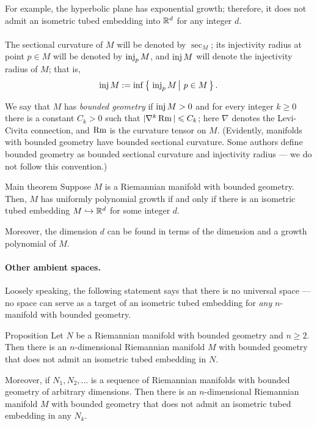 \arxiv{\documentclass[a4paper,10pt]{article}}{\documentclass{mjm}}
\begin{document}
For example,
the hyperbolic plane has exponential growth;
therefore, it does not admit an isometric tubed embedding into $\mathbb{R}^d$ for any integer $d$.




\paragraph{}\label{par:main} 
The sectional curvature of $M$ will be denoted by $\sec_M$;
its injectivity radius at point $p\in M$ will be denoted by $\operatorname{\rm inj}_pM$, and $\operatorname{\rm inj} M$ will denote the injectivity radius of $M$; that is, 
\[\inj M\df \inf\set{\inj_pM}{p\in M}.\]

We say that $M$ has \emph{bounded geometry} if $\operatorname{\rm inj} M>0$ and for every integer $k\ge 0$ there is a constant $C_k > 0$ such that $|\nabla^k \operatorname{\rm Rm}| \leqslant C_k$;
here $\nabla$ denotes the Levi-Civita connection, and $\operatorname{\rm Rm}$ is the curvature tensor on $M$.
(Evidently, manifolds with bounded geometry have bounded sectional curvature.
Some authors define bounded geometry as bounded sectional curvature and injectivity radius --- we do not follow this convention.)

\begin{thm}{Main theorem}
Suppose $M$ is a Riemannian manifold with bounded geometry.
Then, $M$ has uniformly  polynomial growth
if and only if there is an isometric tubed embedding $M \hookrightarrow \mathbb{R}^d$ for some integer $d$.

Moreover, the dimension $d$ can be found in terms of the dimension and a growth polynomial of $M$.
\end{thm}

\paragraph{Other ambient spaces.}\label{par:other-intro}
Loosely speaking, the following statement says that there is no universal space --- no space can serve as a target of an isometric tubed embedding for \textit{any} $n$-manifold with bounded geometry.

\begin{thm}{Proposition}
Let $N$ be a Riemannian manifold with bounded geometry and $n\ge 2$.
Then there is an $n$-dimensional  Riemannian manifold $M$ with bounded geometry that does not admit an isometric tubed embedding in $N$.

Moreover, if $N_1, N_2, \dots $ is a sequence of Riemannian manifolds with bounded geometry of arbitrary dimensions.
Then there is an $n$-dimensional Riemannian manifold $M$ with bounded geometry that does not admit an isometric tubed embedding in any $N_k$.
\end{thm}
\end{document}
